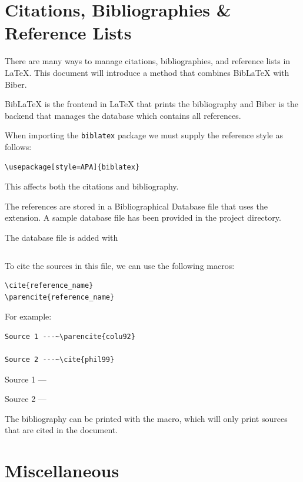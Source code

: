 \documentclass[11pt, twoside]{article}
\begin{document}
\section{Citations, Bibliographies \& Reference Lists}
There are many ways to manage citations, bibliographies, and reference
lists in \LaTeX{}. This document will introduce a method that combines
BibLaTeX with Biber.

BibLaTeX is the frontend in \LaTeX{} that prints the bibliography and
Biber is the backend that manages the database which contains all
references.

When importing the \texttt{biblatex} package we must supply
the reference style as follows:
\begin{verbatim}
\usepackage[style=APA]{biblatex}
\end{verbatim}
This affects both the citations and bibliography.

The references are stored in a Bibliographical Database file that uses
the  extension. A sample database file has been
provided in the project directory.

The database file is added with
\begin{verbatim}

\end{verbatim}
To cite the sources in this file, we can use the following macros:
\begin{verbatim}
\cite{reference_name}
\parencite{reference_name}
\end{verbatim}
For example:
\begin{verbatim}
Source 1 ---~\parencite{colu92}

Source 2 ---~\cite{phil99}
\end{verbatim}
\begin{outputbox}
    Source 1 ---~\parencite{colu92}

    Source 2 ---~\cite{phil99}
\end{outputbox}
The bibliography can be printed with the \texttt{\printbibliography} macro, which will only print sources that are cited in the document.
\newpage
\section{Miscellaneous}
\end{document}

